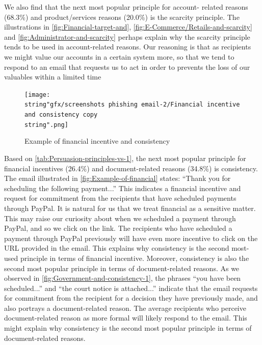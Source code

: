 We also find that the next most popular principle for account- related
reasons (68.3\%) and product/services reasons (20.0\%) is the scarcity
principle. The illustrations in \autoref{fig:Financial-target-and},
\autoref{fig:E-Commerce/Retails-and-scarcity} and \autoref{fig:Administrator-and-scarcity}
perhaps explain why the scarcity principle tends to be used in account-related
reasons. Our reasoning is that as recipients we might value our accounts
in a certain system more, so that we tend to respond to an email that
requests us to act in order to prevents the loss of our valuables
within a limited time

\begin{figure}[H]
\centering{}\texttt{[image: \\string"gfx/screenshots phishing email-2/Financial incentive and consistency copy\\string".png]}\protect\caption{\label{fig:Example-of-financial}Example of financial incentive and
consistency}
\end{figure}


Based on \autoref{tab:Persuasion-principles-vs-1}, the next most
popular principle for financial incentives (26.4\%) and document-related
reasons (34.8\%) is consistency. The email illustrated in \autoref{fig:Example-of-financial}
states: \textquotedblleft Thank you for scheduling the following payment...\textquotedblright{}
This indicates a financial incentive and request for commitment from
the recipients that have scheduled payments through PayPal. It is
natural for us that we treat financial as a sensitive matter. This
may raise our curiosity about when we scheduled a payment through
PayPal, and so we click on the link. The recipients who have scheduled
a payment through PayPal previously will have even more incentive
to click on the URL provided in the email. This explains why consistency
is the second most-used principle in terms of financial incentive.
Moreover, consistency is also the second most popular principle in
terms of document-related reasons. As we observed in \autoref{fig:Government-and-consistency-1},
the phrases \textquotedblleft you have been scheduled...\textquotedblright{}
and \textquotedblleft the court notice is attached...\textquotedblright{}
indicate that the email requests for commitment from the recipient
for a decision they have previously made, and also portrays a document-related
reason. The average recipients who perceive document-related reason
as more formal will likely respond to the email. This might explain
why consistency is the second most popular principle in terms of document-related
reasons.

